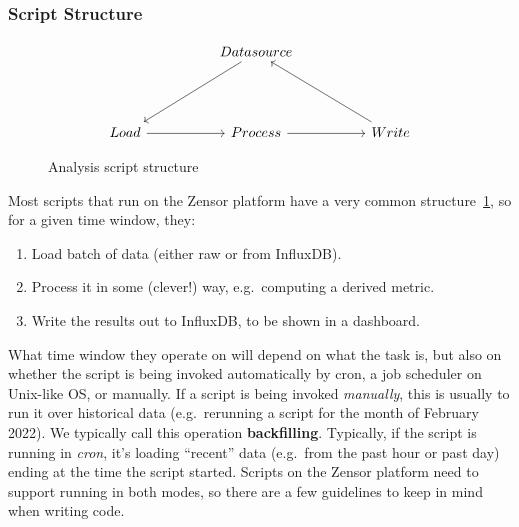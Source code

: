 \subsubsection{Script Structure}\label{subsection:script_structure}
\begin{figure}
	\[\begin{tikzcd}
		&& Datasource \\
		&& {} \\
		Load && Process && Write
		\arrow[from=3-1, to=3-3]
		\arrow[from=3-3, to=3-5]
		\arrow[from=1-3, to=3-1]
		\arrow[from=3-5, to=1-3]
	\end{tikzcd}\]
	\caption{Analysis script structure}
	\label{tik:analysis_script}
\end{figure}

Most scripts that run on the Zensor platform have a very common structure~\ref{tik:analysis_script}, so for a given time window, they:
\begin{enumerate}
	\item Load batch of data (either raw or from InfluxDB).
	\item Process it in some (clever!) way, e.g.\ computing a derived metric.
	\item Write the results out to InfluxDB, to be shown in a dashboard.
\end{enumerate}
What time window they operate on will depend on what the task is, but also on whether the script is being invoked automatically by cron, a job scheduler on Unix-like OS, or manually.
If a script is being invoked \textit{manually}, this is usually to run it over historical data (e.g.\ rerunning a script for the month of February 2022). We typically call this operation \textbf{backfilling}.
Typically, if the script is running in \textit{cron}, it's loading ``recent'' data (e.g.\ from the past hour or past day) ending at the time the script started.
Scripts on the Zensor platform need to support running in both modes, so there are a few guidelines to keep in mind when writing code.
